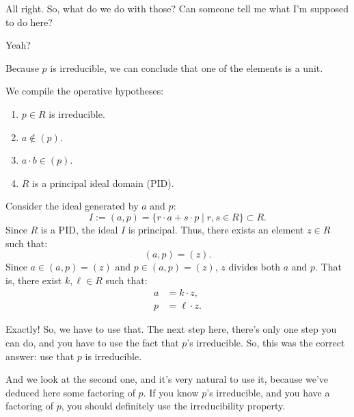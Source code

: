 \begin{proofWrapper}
\begin{speech}[00:50:42 - 00:50:50]
All right. So, what do we do with those? Can someone tell me what I'm supposed to do here?

Yeah?
\end{speech}

\begin{student}
Because $p$ is irreducible, we can conclude that one of the elements is a unit.
\end{student}

\begin{content}
We compile the operative hypotheses:
\begin{enumerate}[label=\textbf{(\arabic*)}]
    \item $p \in R$ is irreducible.
    \item $a \notin (p)$.
    \item $a \cdot b \in (p)$.
    \item $R$ is a principal ideal domain (PID).
\end{enumerate}

Consider the ideal generated by $a$ and $p$:
\begin{equation}\label{eq:part3-def-ideal-iap}
I := (a, p) = \{ r \cdot a + s \cdot p \mid r, s \in R \} \subset R.
\end{equation}
Since $R$ is a PID, the ideal $I$ is principal. Thus, there exists an element $z \in R$ such that:
\begin{equation}\label{eq:part3-ideal-z}
(a, p) = (z).
\end{equation}
Since $a \in (a, p) = (z)$ and $p \in (a, p) = (z)$, $z$ divides both $a$ and $p$. That is, there exist $k, \ell \in R$ such that:
\begin{align}
a &= k \cdot z, \label{eq:part3-a-kz} \\
p &= \ell \cdot z. \label{eq:part3-p-lz}
\end{align}
\end{content}

\begin{speech}[00:50:50 - 00:52:42]
Exactly! So, we have to use that. The next step here, there's only one step you can do, and you have to use the fact that $p$'s irreducible. So, this was the correct answer: use that $p$ is irreducible. 

And we look at the second one, and it's very natural to use it, because we've deduced here some factoring of $p$. If you know $p$'s irreducible, and you have a factoring of $p$, you should definitely use the irreducibility property.


\end{speech}
\end{proofWrapper}
